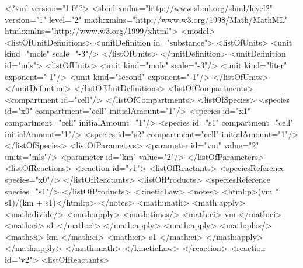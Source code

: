 \documentclass[10pt,twocolumntoc]{cekarticle}
\begin{document}
\begin{example}
<?xml version="1.0"?>
<sbml xmlns="http://www.sbml.org/sbml/level2" version="1" level="2"
      math:xmlns="http://www.w3.org/1998/Math/MathML"
      html:xmlns="http://www.w3.org/1999/xhtml">
    <model>
        <listOfUnitDefinitions>
            <unitDefinition id="substance">
                <listOfUnits>
                    <unit kind="mole" scale="-3"/>
                </listOfUnits>
            </unitDefinition>
            <unitDefinition id="mls">
                <listOfUnits>
                    <unit kind="mole"   scale="-3"/>
                    <unit kind="liter"  exponent="-1"/>
                    <unit kind="second" exponent="-1"/>
                </listOfUnits>
            </unitDefinition>
        </listOfUnitDefinitions>
        <listOfCompartments>
            <compartment id="cell"/>
        </listOfCompartments>
        <listOfSpecies>
            <species id="x0" compartment="cell" initialAmount="1"/>
            <species id="x1" compartment="cell" initialAmount="1"/>
            <species id="s1" compartment="cell" initialAmount="1"/>
            <species id="s2" compartment="cell" initialAmount="1"/>
        </listOfSpecies>
        <listOfParameters>
            <parameter id="vm" value="2" units="mls"/>
            <parameter id="km" value="2"/>
        </listOfParameters>
        <listOfReactions>
            <reaction id="v1">
                <listOfReactants>
                    <speciesReference species="x0"/>
                </listOfReactants>
                <listOfProducts>
                    <speciesReference species="s1"/>
                </listOfProducts>
                <kineticLaw>
                    <notes>
                        <html:p>(vm * s1)/(km + s1)</html:p>
                    </notes>
                    <math:math>
                        <math:apply>
                            <math:divide/>
                            <math:apply>
                                <math:times/>
                                <math:ci> vm </math:ci>
                                <math:ci> s1 </math:ci>
                            </math:apply>
                            <math:apply>
                                <math:plus/>
                                <math:ci> km </math:ci>
                                <math:ci> s1 </math:ci>
                            </math:apply>
                        </math:apply>
                    </math:math>
                </kineticLaw>
            </reaction>
            <reaction id="v2">
                <listOfReactants>

\end{example}
\end{document}
